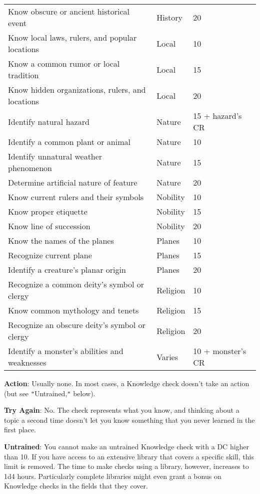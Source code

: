 \begin{table}[]
\begin{tabular}{lll}
Know obscure or ancient historical event& History& 20 \\
Know local laws, rulers, and popular locations& Local& 10 \\ 
Know a common rumor or local tradition& Local& 15 \\
Know hidden organizations, rulers, and locations& Local& 20 \\
Identify natural hazard& Nature& 15 + hazard's CR \\ 
Identify a common plant or animal& Nature& 10 \\
Identify unnatural weather phenomenon& Nature& 15 \\
Determine artificial nature of feature& Nature& 20 \\
Know current rulers and their symbols& Nobility& 10 \\
Know proper etiquette& Nobility& 15 \\ 
Know line of succession& Nobility& 20 \\
Know the names of the planes& Planes& 10 \\
Recognize current plane& Planes& 15 \\
Identify a creature's planar origin& Planes& 20 \\
Recognize a common deity's symbol or clergy& Religion& 10 \\
Know common mythology and tenets& Religion& 15 \\
Recognize an obscure deity's symbol or clergy& Religion& 20 \\
Identify a monster's abilities and weaknesses& Varies& 10 + monster's CR\\
\end{tabular}
\end{table}
				
\textbf{Action}: Usually none. In most cases, a Knowledge check doesn't take an action (but see \texttt{{}"{}}Untrained,\texttt{{}"{}} below).
				
\textbf{Try Again}: No. The check represents what you know, and thinking about a topic a second time doesn't let you know something that you never learned in the first place.
				
\textbf{Untrained}: You cannot make an untrained Knowledge check with a DC higher than 10. If you have access to an extensive library that covers a specific skill, this limit is removed. The time to make checks using a library, however, increases to 1d4 hours. Particularly complete libraries might even grant a bonus on Knowledge checks in the fields that they cover.
        	
